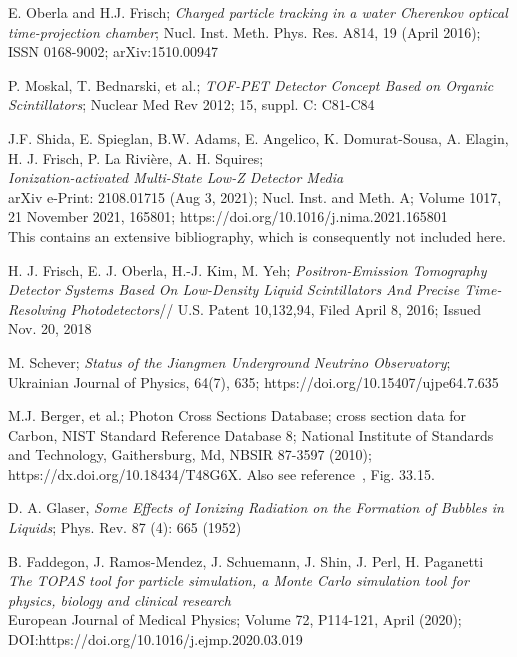 \documentclass[12pt]{article}
\begin{document}
\begin{thebibliography}{99}
 E. Oberla and H.J. Frisch; {\it Charged particle
  tracking in a water Cherenkov optical time-projection chamber};
  Nucl. Inst. Meth. Phys. Res. A814, 19 (April 2016);
  ISSN 0168-9002;  arXiv:1510.00947

P.  Moskal,  T.  Bednarski,  et al.;
 {\it TOF-PET Detector Concept Based on Organic Scintillators};
 Nuclear Med Rev 2012; 15, suppl. C: C81-C84

 J.F. Shida, E. Spieglan, B.W. Adams, E. Angelico,
K. Domurat-Sousa, A. Elagin, H. J. Frisch,
P. La Rivi\`{e}re, A. H. Squires;\\
{\it Ionization-activated Multi-State Low-Z Detector Media}\\
arXiv e-Print: 2108.01715 (Aug 3, 2021);
Nucl. Inst. and Meth. A; Volume 1017, 21 November 2021, 165801;
https://doi.org/10.1016/j.nima.2021.165801\\
 This contains an extensive bibliography, which is consequently not included here.


 H. J. Frisch, E. J. Oberla, H.-J. Kim, M. Yeh;
{\it Positron-Emission Tomography Detector Systems Based On Low-Density
Liquid Scintillators And Precise Time-Resolving Photodetectors}//
  U.S. Patent 10,132,94, Filed April 8, 2016; Issued Nov. 20, 2018

 M. Schever; {\it Status of the Jiangmen Underground Neutrino
Observatory};\\
 Ukrainian Journal of Physics, 64(7), 635; https://doi.org/10.15407/ujpe64.7.635

 M.J. Berger, et al.;
 Photon Cross Sections Database; cross section data for Carbon, NIST
Standard Reference Database 8; National Institute of Standards and
Technology, Gaithersburg, Md, NBSIR 87-3597 (2010);
https://dx.doi.org/10.18434/T48G6X. Also see
reference~\cite{PDG_Groom_Klein_2019}, Fig. 33.15.

 D. A. Glaser,
{\it Some Effects of Ionizing Radiation on the Formation of Bubbles in
Liquids}; Phys. Rev. 87 (4): 665 (1952)

 B. Faddegon, J. Ramos-Mendez, J. Schuemann, J. Shin, J. Perl, H.
 Paganetti\\
{\it The TOPAS tool for particle simulation, a Monte Carlo simulation
tool for physics, biology and clinical research}\\
European Journal of Medical Physics;  Volume 72, P114-121, April
(2020); DOI:https://doi.org/10.1016/j.ejmp.2020.03.019


\end{thebibliography}
\end{document}
